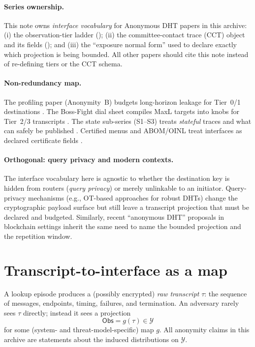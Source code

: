 \documentclass[11pt]{article}
\begin{document}
\paragraph{Series ownership.}
This note owns \emph{interface vocabulary} for Anonymous DHT papers in this archive:
(i) the observation-tier ladder ();
(ii) the committee-contact trace (CCT) object and its fields (); and
(iii) the ``exposure normal form'' used to declare exactly which projection is being bounded.
All other papers should cite this note instead of re-defining tiers or the CCT schema.

\paragraph{Non-redundancy map.}
The profiling paper (Anonymity~B) budgets long-horizon leakage for Tier~0/1 destinations \cite{series:profiling}.
The Boss-Fight dial sheet compiles MaxL targets into knobs for Tier~2/3 transcripts \cite{series:bossfightA,series:bossfightB}.
The state sub-series (S1--S3) treats \emph{stateful} traces and what can safely be published \cite{series:state1,series:state2,series:state3}.
Certified menus and ABOM/OINL treat interfaces as declared certificate fields \cite{series:certmenus,series:abomoinl}.


\paragraph{Orthogonal: query privacy and modern contexts.}
The interface vocabulary here is agnostic to whether the destination key is hidden from routers (\emph{query privacy})
or merely unlinkable to an initiator.
Query-privacy mechanisms (e.g., OT-based approaches for robust DHTs) change the cryptographic payload surface but still leave a transcript projection that must be declared and budgeted. \cite{BackesQueryPrivacy2012}
Similarly, recent ``anonymous DHT'' proposals in blockchain settings inherit the same need to name the bounded projection and the repetition window. \cite{TsengNCDHT2024}


\section{Transcript-to-interface as a map}
A lookup episode produces a (possibly encrypted) \emph{raw transcript} $\tau$: the sequence of messages, endpoints, timing, failures, and termination.
An adversary rarely sees $\tau$ directly; instead it sees a projection
\[
\mathsf{Obs} = g(\tau) \in \mathcal{Y}
\]
for some (system- and threat-model-specific) map $g$.
All anonymity claims in this archive are statements about the induced distributions on $\mathcal{Y}$.
\end{document}

